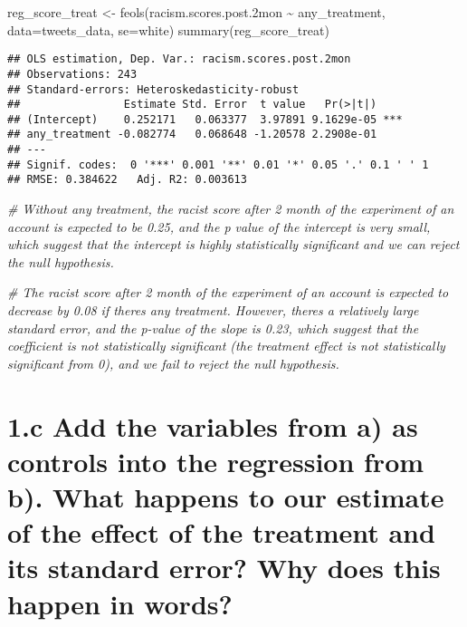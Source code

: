 \documentclass[
]{article}
\newenvironment{Shaded}{\begin{snugshade}}{\end{snugshade}}
\newcommand{\AttributeTok}[1]{\textcolor[rgb]{0.77,0.63,0.00}{#1}}
\newcommand{\CommentTok}[1]{\textcolor[rgb]{0.56,0.35,0.01}{\textit{#1}}}
\newcommand{\FloatTok}[1]{\textcolor[rgb]{0.00,0.00,0.81}{#1}}
\newcommand{\FunctionTok}[1]{\textcolor[rgb]{0.00,0.00,0.00}{#1}}
\newcommand{\NormalTok}[1]{#1}
\newcommand{\OtherTok}[1]{\textcolor[rgb]{0.56,0.35,0.01}{#1}}
\newcommand{\SpecialCharTok}[1]{\textcolor[rgb]{0.00,0.00,0.00}{#1}}
\newcommand{\StringTok}[1]{\textcolor[rgb]{0.31,0.60,0.02}{#1}}
\begin{document}
\begin{Shaded}
\begin{Highlighting}[]
\NormalTok{reg\_score\_treat }\OtherTok{\textless{}{-}} \FunctionTok{feols}\NormalTok{(racism.scores.post}\FloatTok{.2}\NormalTok{mon }\SpecialCharTok{\textasciitilde{}}\NormalTok{ any\_treatment, }\AttributeTok{data=}\NormalTok{tweets\_data, }\AttributeTok{se=}\StringTok{\textquotesingle{}white\textquotesingle{}}\NormalTok{)}
\FunctionTok{summary}\NormalTok{(reg\_score\_treat)}
\end{Highlighting}
\end{Shaded}

\begin{verbatim}
## OLS estimation, Dep. Var.: racism.scores.post.2mon
## Observations: 243 
## Standard-errors: Heteroskedasticity-robust 
##                Estimate Std. Error  t value   Pr(>|t|)    
## (Intercept)    0.252171   0.063377  3.97891 9.1629e-05 ***
## any_treatment -0.082774   0.068648 -1.20578 2.2908e-01    
## ---
## Signif. codes:  0 '***' 0.001 '**' 0.01 '*' 0.05 '.' 0.1 ' ' 1
## RMSE: 0.384622   Adj. R2: 0.003613
\end{verbatim}

\begin{Shaded}
\begin{Highlighting}[]
\CommentTok{\# Without any treatment, the racist score after 2 month of the experiment of an account is expected to be 0.25, and the p value of the intercept is very small, which suggest that the intercept is highly statistically significant and we can reject the null hypothesis.}

\CommentTok{\# The racist score after 2 month of the experiment of an account is expected to decrease by 0.08 if there\textquotesingle{}s any treatment. However, there\textquotesingle{}s a relatively large standard error, and the p{-}value of the slope is 0.23, which suggest that the coefficient is not statistically significant (the treatment effect is not statistically significant from 0), and we fail to reject the null hypothesis. }
\end{Highlighting}
\end{Shaded}

\hypertarget{c-add-the-variables-from-a-as-controls-into-the-regression-from-b.-what-happens-to-our-estimate-of-the-effect-of-the-treatment-and-its-standard-error-why-does-this-happen-in-words}{%
\section{1.c Add the variables from a) as controls into the regression
from b). What happens to our estimate of the effect of the treatment and
its standard error? Why does this happen in
words?}\label{c-add-the-variables-from-a-as-controls-into-the-regression-from-b.-what-happens-to-our-estimate-of-the-effect-of-the-treatment-and-its-standard-error-why-does-this-happen-in-words}}
\end{document}

